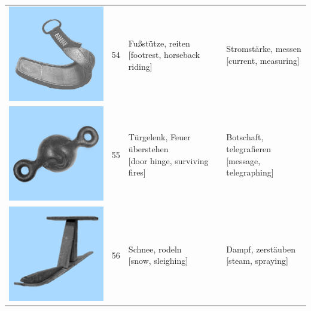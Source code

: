 \documentclass[
  english,
  doc,12pt,twoside,floatsintext]{apa7}
\begin{document}
\begin{center}
\begin{ThreePartTable}
{\begin{longtable}{llll}
\includegraphics[valign=c, scale=0.23]{../materials/unfamiliar/54.png} & 54 & \makecell[l]{Fußstütze, reiten\\{[footrest, horseback riding]}} & \makecell[l]{Stromstärke, messen\\{[current, measuring]}}\\
\includegraphics[valign=c, scale=0.23]{../materials/unfamiliar/55.png} & 55 & \makecell[l]{Türgelenk, Feuer überstehen\\{[door hinge, surviving fires]}} & \makecell[l]{Botschaft, telegrafieren\\{[message, telegraphing]}}\\
\includegraphics[valign=c, scale=0.23]{../materials/unfamiliar/56.png} & 56 & \makecell[l]{Schnee, rodeln\\{[snow, sleighing]}} & \makecell[l]{Dampf, zerstäuben\\{[steam, spraying]}}\\

\end{longtable}}
\end{ThreePartTable}
\end{center}
\end{document}
